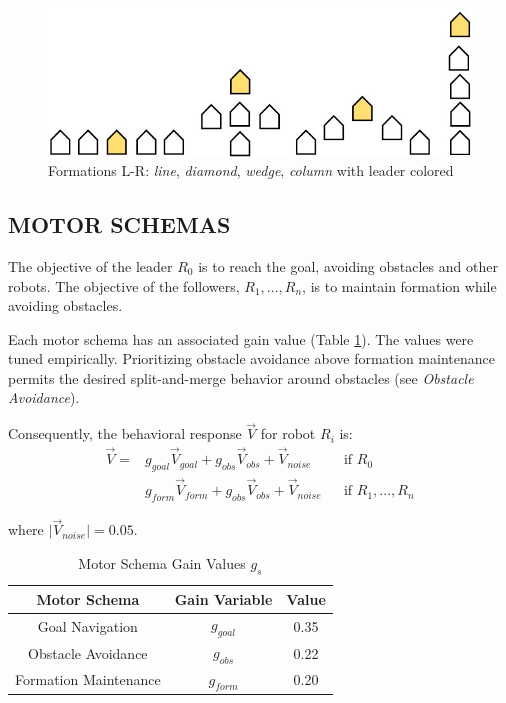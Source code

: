 \documentclass[letterpaper, 10 pt, conference]{ieeeconf}  %
\begin{document}
\begin{figure}[thpb]
\centering
\includegraphics[width=0.7\linewidth]{images/formation_shapes.jpg}
\caption{Formations L-R: \textit{line}, \textit{diamond}, \textit{wedge}, \textit{column} with leader colored}
\label{formation_shapes}
\end{figure}

\subsection{MOTOR SCHEMAS}

The objective of the leader $R_0$ is to reach the goal, avoiding obstacles and other robots. The objective of the followers, $R_1,...,R_n$, is to maintain formation while avoiding obstacles.

Each motor schema has an associated gain value (Table \ref{motor_schema_gs}). The values were tuned empirically. Prioritizing obstacle avoidance above formation maintenance permits the desired split-and-merge behavior around obstacles (see \textit{Obstacle Avoidance}).

Consequently, the behavioral response $\vec{V}$ for robot $R_i$ is:
\begin{equation}
\begin{aligned}
\vec{V} = & g_{goal} \vec{V}_{goal} + g_{obs} \vec{V}_{obs} + \vec{V}_{noise}    && \text{if $R_0$} \\
              & g_{form} \vec{V}_{form} + g_{obs} \vec{V}_{obs} + \vec{V}_{noise}   && \text{if $R_1,...,R_n$}
\end{aligned}
\end{equation}

where $\lvert\vec{V}_{noise}\rvert = 0.05$.

\begin{table}[h]
\caption{Motor Schema Gain Values $g_s$}
\label{motor_schema_gs}
\begin{center}
\begin{tabular}{|c|c|c|}
\hline
Motor Schema & Gain Variable & Value \\
\hline
Goal Navigation & $g_{goal}$ & 0.35 \\
Obstacle Avoidance & $g_{obs}$ & 0.22 \\
Formation Maintenance & $g_{form}$ & 0.20 \\
\hline
\end{tabular}
\end{center}
\end{table}
\end{document}
